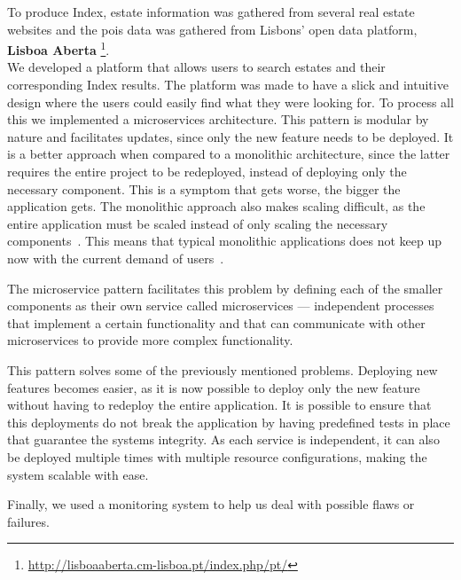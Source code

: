 To produce Index, estate information was gathered from several real estate websites and the \acrshort{poi}s data was gathered from Lisbons' open data platform, \textbf{Lisboa Aberta} \footnote{\url{http://lisboaaberta.cm-lisboa.pt/index.php/pt/}}. \\

We developed a platform that allows users to search estates and their corresponding Index results. The platform was made to have a slick and intuitive design where the users could easily find what they were looking for. To process all this we implemented a microservices architecture. This pattern is modular by nature and facilitates updates, since only the new feature needs to be deployed. It is a better approach when compared to a monolithic architecture, since the latter requires the entire project to be redeployed, instead of deploying only the necessary component. This is a symptom that gets worse, the bigger the application gets. The monolithic approach also makes scaling difficult, as the entire application must be scaled instead of only scaling the necessary components~\cite{7333476}. This means that typical monolithic applications does not keep up now with the current demand of users~\cite{7458761}. 

The microservice pattern facilitates this problem by defining each of the smaller components as their own service called microservices --- independent processes that implement a certain functionality and that can communicate with other microservices to provide more complex functionality.

This pattern solves some of the previously mentioned problems. Deploying new features becomes easier, as it is now possible to deploy only the new feature without having to redeploy the entire application. It is possible to ensure that this deployments do not break the application by having predefined tests in place that guarantee the systems integrity. As each service is independent, it can also be deployed multiple times with multiple resource configurations, making the system scalable with ease. 

Finally, we used a monitoring system to help us deal with possible flaws or failures.

